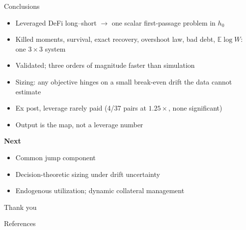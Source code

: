 \documentclass[aspectratio=169,10pt]{beamer}
\newcommand{\E}{\mathbb{E}}
\begin{document}
\begin{frame}{Conclusions}
  \begin{itemize}
    \item Leveraged DeFi long--short $\rightarrow$ one scalar first-passage problem in $h_0$
    \item Killed moments, survival, exact recovery, overshoot law, bad debt, $\E\log W$: one $3\times3$ system
    \item Validated; three orders of magnitude faster than simulation
    \item Sizing: any objective hinges on a small break-even drift the data cannot estimate
    \item Ex post, leverage rarely paid (4/37 pairs at $1.25\times$, none significant)
    \item \alert{Output is the map, not a leverage number}
  \end{itemize}
  \vspace{0.6em}
  \textbf{Next}
  \begin{itemize}
    \item Common jump component
    \item Decision-theoretic sizing under drift uncertainty
    \item Endogenous utilization; dynamic collateral management
  \end{itemize}
  \vfill
  \begin{center}
    \large Thank you
  \end{center}
\end{frame}

\begin{frame}{References}
  \footnotesize
  
  
\end{frame}
\end{document}
